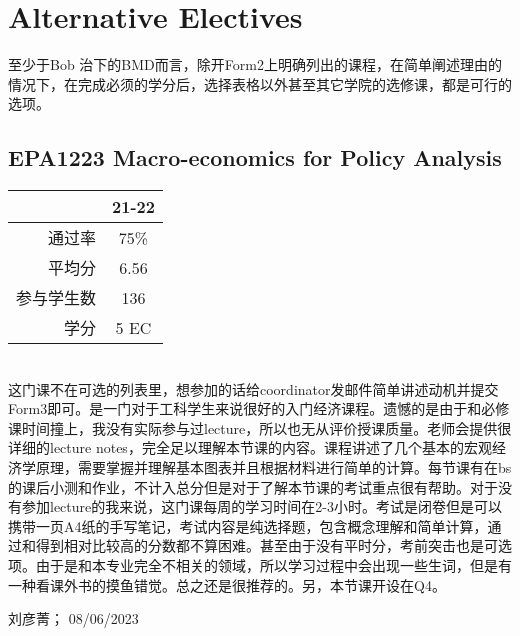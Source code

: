\vspace{\betsubsec} %
\section{Alternative Electives}

至少于Bob 治下的BMD而言，除开Form2上明确列出的课程，在简单阐述理由的情况下，在完成必须的学分后，选择表格以外甚至其它学院的选修课，都是可行的选项。

\subsection{EPA1223 Macro-economics for Policy Analysis}
\begin{minipage}{0.45\textwidth}
\centering
{}
\end{minipage}%
\begin{minipage}{0.45\textwidth}
\raggedleft
\begin{tabular}{r|c}
\textbf{ } & \textbf{21-22} \\ \hline
通过率 &75\% \\ 
平均分 & 6.56 \\ 
参与学生数 &136 \\
学分 & 5 EC\\
\end{tabular}
\end{minipage}\\

这门课不在可选的列表里，想参加的话给coordinator发邮件简单讲述动机并提交Form3即可。是一门对于工科学生来说很好的入门经济课程。遗憾的是由于和必修课时间撞上，我没有实际参与过lecture，所以也无从评价授课质量。老师会提供很详细的lecture notes，完全足以理解本节课的内容。课程讲述了几个基本的宏观经济学原理，需要掌握并理解基本图表并且根据材料进行简单的计算。每节课有在bs的课后小测和作业，不计入总分但是对于了解本节课的考试重点很有帮助。对于没有参加lecture的我来说，这门课每周的学习时间在2-3小时。考试是闭卷但是可以携带一页A4纸的手写笔记，考试内容是纯选择题，包含概念理解和简单计算，通过和得到相对比较高的分数都不算困难。甚至由于没有平时分，考前突击也是可选项。由于是和本专业完全不相关的领域，所以学习过程中会出现一些生词，但是有一种看课外书的摸鱼错觉。总之还是很推荐的。另，本节课开设在Q4。

\begin{flushright}
刘彦菁； 08/06/2023
\end{flushright}